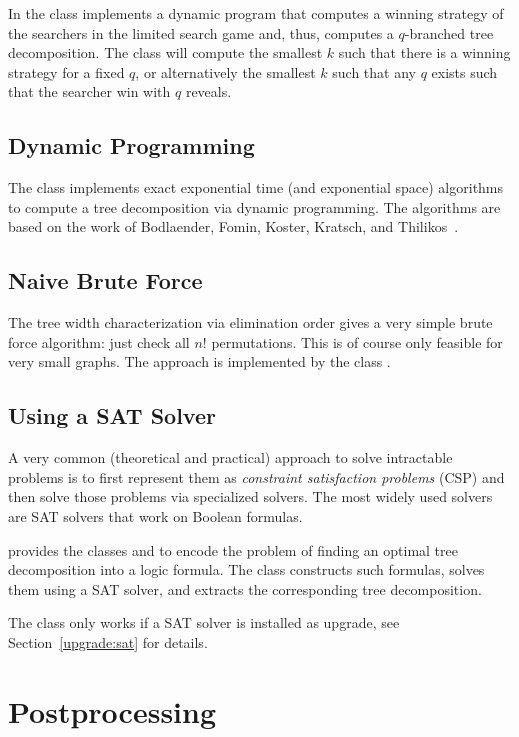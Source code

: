 \documentclass[a4paper, ukenglish, twoside, openright]{jdrasilmanual}
\begin{document}
In \Jdrasil{} the class  implements a
dynamic program that computes a winning strategy of the searchers in
the limited search game and, thus, computes a $q$-branched tree
decomposition. The class will compute the smallest $k$ such that there
is a winning strategy for a fixed $q$, or alternatively the smallest
$k$ such that any $q$ exists such that the searcher win with $q$ reveals.

\section{Dynamic Programming}
The class  implements exact exponential time (and exponential space)
algorithms to compute a tree decomposition via dynamic programming.
The algorithms are based on the work of 
Bodlaender, Fomin, Koster, Kratsch, and Thilikos~\cite{BodlaenderFKKT2012}.

\section{Naive Brute Force}
The tree width characterization via elimination order gives a very
simple brute force algorithm: just check all $n!$ permutations. This
is of course only feasible for very small graphs. The approach is
implemented by the class .

\section{Using a SAT Solver}
A very common (theoretical and practical) approach to solve intractable
problems is to first represent them as \emph{constraint satisfaction
  problems} (CSP) and then solve those problems via specialized solvers. The
most widely used solvers are SAT solvers that work on Boolean
formulas.

\Jdrasil{} provides the classes  and
 to encode the problem of finding an optimal
tree decomposition into a logic formula. The class
 constructs such formulas, solves them using a
SAT solver, and extracts the corresponding tree decomposition.

The class  only works if a SAT solver is
installed as upgrade, see Section~\ref{upgrade:sat} for details.

\chapter{Postprocessing}
\end{document}
